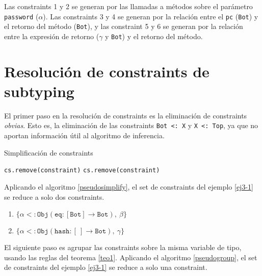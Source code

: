 Las constraints 1 y 2 se generan por las llamadas a métodos sobre el parámetro \texttt{password} ($\alpha$). Las constraints 3 y 4 se generan por la relación entre el \texttt{pc} (\texttt{Bot}) y el retorno del método (\texttt{Bot}), y las constraint 5 y 6 se generan por la relación entre la expresión de retorno ($\gamma$ y \texttt{Bot}) y el retorno del método.

\clearpage %

\section{Resolución de constraints de subtyping} \label{propuestaRes}

El primer paso en la resolución de constraints es la eliminación de constraints \textit{obvias}. Esto es, la eliminación de las constraints \texttt{Bot <: X} y \texttt{X <: Top}, ya que no aportan información útil al algoritmo de inferencia.

\begin{algorithm}\captionsetup{labelsep=newline}
  \centering
  \caption{Simplificación de constraints}
  \label{pseudosimplify}
    \begin{algorithmic}[1]
              \State \texttt{cs.remove(constraint)}
              \State \texttt{cs.remove(constraint)}
            \EndIf
          \EndFor
      \EndFunction
    \end{algorithmic}
\end{algorithm}

Aplicando el algoritmo \ref{pseudosimplify}, el set de constraints del ejemplo \ref{ej3-1} se reduce a solo dos constraints.

\begin{enumerate}
  \item $\mathtt{\{\alpha <: Obj(eq : [Bot] \rightarrow Bot),\ \beta\}}$
  \item $\mathtt{\{\alpha <: Obj(hash : [\ ] \rightarrow Bot),\ \gamma\}}$
\end{enumerate}

El siguiente paso es agrupar las constraints sobre la misma variable de tipo, usando las reglas del teorema \ref{teo1}. Aplicando el algoritmo \ref{pseudogroup}, el set de constraints del ejemplo \ref{ej3-1} se reduce a solo una constraint.

